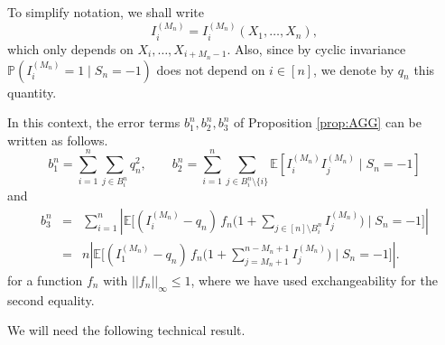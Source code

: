 \documentclass[a4paper,11pt]{article}
\newcommand{\E}{\mathbb{E}}
\DeclareRobustCommand{\P}{\mathbb{P}}
\DeclareRobustCommand{\1}{\mathbf{1}}
\begin{document}
To simplify notation, we shall write
$$I^{(M_{n})}_{i}=I^{(M_{n})}_{i}(X_{1}, \ldots,X_{n}),$$
which only depends on $X_{i}, \ldots,X_{i+M_{n}-1}$.
Also, since by cyclic invariance $\P(I^{(M_{n})}_{i}=1 \mid S_{n}=-1)$ does not depend on $i \in [n]$, we denote by $q_{n}$ this quantity. 

In this context, the error terms $b^{n}_{1}, b^{n}_{2}, b^{n }_{3}$ of Proposition \ref{prop:AGG} can be written as follows.
$$b_{1}^{n} = \sum_{i=1}^n \sum_{j \in B^n_i} q_{n}^{2}, \qquad  b_{2}^{n}=\sum_{i=1}^n \sum_{j \in B^n_i \setminus \{i\}} \E\left[I^{(M_{n})}_i I^{(M_{n})}_j \mid S_{n}=-1 \right]$$
and
\begin{eqnarray*}
b^{n}_{3}&=&\sum_{i=1}^n \left| \E\bigl[(I^{(M_{n})}_i - q_{n})\, f_{n}\big( 1 +\sum_{j\in [n]\setminus B^n_i} I^{(M_{n})}_j\big) \mid S_{n}=-1\bigr]\right|\\
&=& n\left| \E\bigl[(I^{(M_{n})}_1 - q_{n})\, f_{n}\big( 1 +\sum_{j=M_{n}+1}^{n-M_{n}+1} I^{(M_{n})}_j\big) \mid S_{n}=-1\bigr]\right|.\end{eqnarray*}
for a function $f_{n}$ with $||f_{n}||_{\infty} \leq 1$, where we have used exchangeability for the second equality.

We will need the following technical result.
\end{document}
